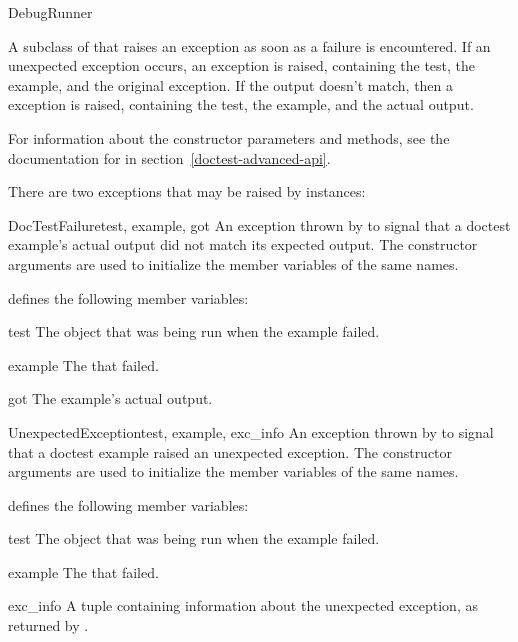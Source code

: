 \begin{classdesc}{DebugRunner}{}

    A subclass of  that raises an exception as
    soon as a failure is encountered.  If an unexpected exception
    occurs, an  exception is raised,
    containing the test, the example, and the original exception.  If
    the output doesn't match, then a 
    exception is raised, containing the test, the example, and the
    actual output.

    For information about the constructor parameters and methods, see
    the documentation for  in
    section~\ref{doctest-advanced-api}.
\end{classdesc}

There are two exceptions that may be raised by 
instances:

\begin{excclassdesc}{DocTestFailure}{test, example, got}
    An exception thrown by  to signal that a
    doctest example's actual output did not match its expected output.
    The constructor arguments are used to initialize the member
    variables of the same names.
\end{excclassdesc}
 defines the following member variables:
\begin{memberdesc}{test}
    The  object that was being run when the example failed.
\end{memberdesc}
\begin{memberdesc}{example}
    The  that failed.
\end{memberdesc}
\begin{memberdesc}{got}
    The example's actual output.
\end{memberdesc}

\begin{excclassdesc}{UnexpectedException}{test, example, exc_info}
    An exception thrown by  to signal that a
    doctest example raised an unexpected exception.  The constructor
    arguments are used to initialize the member variables of the same
    names.
\end{excclassdesc}
 defines the following member variables:
\begin{memberdesc}{test}
    The  object that was being run when the example failed.
\end{memberdesc}
\begin{memberdesc}{example}
    The  that failed.
\end{memberdesc}
\begin{memberdesc}{exc_info}
    A tuple containing information about the unexpected exception, as
    returned by .
\end{memberdesc}

